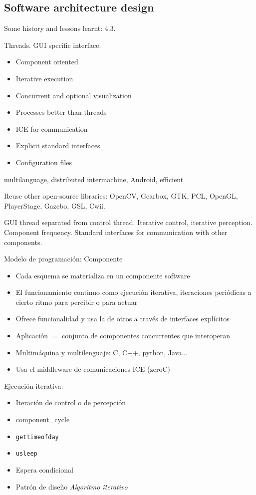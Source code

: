 \documentclass[twocolumn]{svjour3}          %
\begin{document}
\subsection{Software architecture design}

Some history and lessons learnt: 4.3. 

Threads. GUI specific interface. 

\begin{itemize}
\item Component oriented 
\item Iterative execution
\item Concurrent and optional visualization
\item Processes better than threads
\item ICE for communication
\item Explicit standard interfaces
\item Configuration files 
\end{itemize}

multilanguage, distributed intermachine, Android, efficient

Reuse other open-source libraries: OpenCV, Gearbox, GTK, PCL, OpenGL, PlayerStage, Gazebo, GSL, Cwii.


GUI thread separated from control thread.
Iterative control, iterative perception. Component frequency.
Standard interfaces for communication with other components.

Modelo de programación: Componente
\begin{itemize}
\item Cada esquema se materializa en un {componente} software 
\item El funcionamiento continuo como {ejecución iterativa}, iteraciones periódicas a cierto ritmo para percibir o para actuar
\item Ofrece funcionalidad y usa la de otros a través de {interfaces} explícitos
\item Aplicación $=$ conjunto de componentes concurrentes que interoperan
\item {Multimáquina} y {multilenguaje}: C, C++, python, Java... 
\item Usa el middleware de comunicaciones ICE (zeroC)
\end{itemize}

Ejecución iterativa:
\begin{itemize}
\item Iteración de control o de percepción
\item component\_cycle 
\item \texttt{gettimeofday}
\item \texttt{usleep}
\item Espera condicional
\item Patrón de diseño \textit{Algoritmo iterativo}
\end{itemize}
\end{document}
